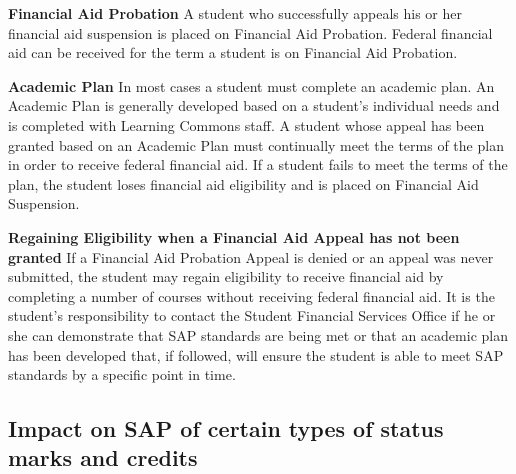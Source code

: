 \documentclass[
  letterpaper,
]{scrbook}
\begin{document}
\textbf{Financial Aid Probation} A student who successfully appeals his
or her financial aid suspension is placed on Financial Aid Probation.
Federal financial aid can be received for the term a student is on
Financial Aid Probation.

\textbf{Academic Plan} In most cases a student must complete an academic
plan. An Academic Plan is generally developed based on a student's
individual needs and is completed with Learning Commons staff. A student
whose appeal has been granted based on an Academic Plan must continually
meet the terms of the plan in order to receive federal financial aid. If
a student fails to meet the terms of the plan, the student loses
financial aid eligibility and is placed on Financial Aid Suspension.

\textbf{Regaining Eligibility when a Financial Aid Appeal has not been
granted} If a Financial Aid Probation Appeal is denied or an appeal was
never submitted, the student may regain eligibility to receive financial
aid by completing a number of courses without receiving federal
financial aid. It is the student's responsibility to contact the Student
Financial Services Office if he or she can demonstrate that SAP
standards are being met or that an academic plan has been developed
that, if followed, will ensure the student is able to meet SAP standards
by a specific point in time.

\hypertarget{impact-on-sap-of-certain-types-of-status-marks-and-credits}{%
\subsection{Impact on SAP of certain types of status marks and
credits}\label{impact-on-sap-of-certain-types-of-status-marks-and-credits}}
\end{document}
